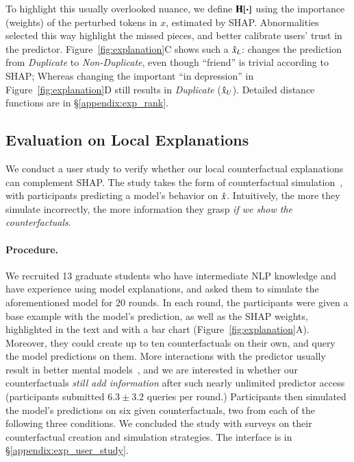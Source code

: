 To highlight this usually overlooked nuance, we define $\operatorname*{\mathbf{H}}[\boldsymbol{\cdot}]$ using the importance (weights) of the perturbed tokens in $x$, estimated by SHAP.
Abnormalities selected this way highlight the missed pieces, and better calibrate users' trust in the predictor. 
Figure~\ref{fig:explanation}C shows such a $\hat{x}_L$:  changes the prediction from \emph{Duplicate} to \emph{Non-Duplicate}, even though ``friend'' is trivial according to SHAP; Whereas changing the important ``in depression'' in Figure~\ref{fig:explanation}D still results in \emph{Duplicate} ($\hat{x}_U$).
Detailed distance functions are in \S\ref{appendix:exp_rank}.



\subsection{Evaluation on Local Explanations}
\label{subsec:exp_user_study}

We conduct a user study to verify whether our local counterfactual explanations can complement SHAP.
The study takes the form of counterfactual simulation~\cite{hase2020evaluating}, with participants predicting a model's behavior on $\hat{x}$.
Intuitively, the more they simulate incorrectly, the more information they grasp \emph{if we show the counterfactuals}.

\paragraph{Procedure.}
We recruited 13 graduate students who have intermediate NLP knowledge and have experience using model explanations, and asked them to simulate the aforementioned \qqp model for 20 rounds.
In each round, the participants were given a base example with the model's prediction, as well as the SHAP weights, highlighted in the text and with a bar chart (Figure~\ref{fig:explanation}A).
Moreover, they could create up to ten counterfactuals on their own, and query the model predictions on them.
More interactions with the predictor usually result in better mental models~\cite{miller}, and we are interested in whether our counterfactuals \emph{still add information} after such nearly unlimited predictor access (participants submitted $6.3\pm3.2$ queries per round.)
Participants then simulated the model's predictions on six given counterfactuals, two from each of the following three conditions.
We concluded the study with surveys on their counterfactual creation and simulation strategies.
The interface is in \S\ref{appendix:exp_user_study}.

